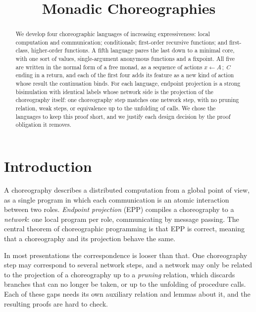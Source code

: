 \documentclass[11pt]{report}
\title{Monadic Choreographies}
\theoremstyle{plain}
\theoremstyle{definition}
\theoremstyle{remark}
\newcommand{\bind}[3]{#1 \leftarrow #2\,;\;#3}
\begin{document}
\maketitle

\begin{abstract}
  We develop four choreographic languages of increasing expressiveness:
  local computation and communication; conditionals; first-order recursive
  functions; and first-class, higher-order functions.  A fifth language pares
  the last down to a minimal core, with one sort of values, single-argument
  anonymous functions and a fixpoint.  All five are written
  in the normal form of a free monad, as a sequence of actions $\bind{x}{A}{C}$
  ending in a return, and each of the first four adds its feature as a new
  kind of action whose result the continuation binds.  For each language, endpoint projection is a
  strong bisimulation with identical labels whose network side is the
  projection of the choreography itself: one choreography step matches one
  network step, with no pruning relation, weak steps, or equivalence up to the
  unfolding of calls.  We chose the languages to keep this proof short, and
  we justify each design decision by the proof obligation it removes.
\end{abstract}

\tableofcontents

\chapter*{Introduction}

A choreography describes a distributed computation from a global point of
view, as a single program in which each communication is an atomic
interaction between two roles.  \emph{Endpoint projection} (EPP) compiles a
choreography to a \emph{network}: one local program per role, communicating
by message passing.  The central theorem of choreographic programming is that
EPP is correct, meaning that a choreography and its projection behave the
same.

In most presentations the correspondence is looser than that.  One
choreography step may correspond to several network steps, and a network may
only be related to the projection of a choreography up to a \emph{pruning}
relation, which discards branches that can no longer be taken, or up to the
unfolding of procedure calls.  Each of these gaps needs its own auxiliary
relation and lemmas about it, and the resulting proofs are hard to check.
\end{document}
